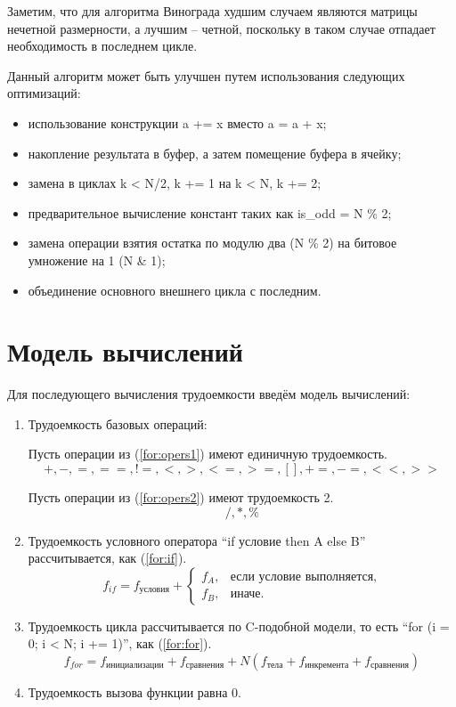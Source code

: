 \clearpage

Заметим, что для алгоритма Винограда худшим случаем являются матрицы нечетной размерности, а лучшим -- четной, поскольку
в таком случае отпадает необходимость в последнем цикле.

Данный алгоритм может быть улучшен путем использования следующих оптимизаций:
\begin{itemize}
	\item использование конструкции a += x вместо a = a + x;
	\item накопление результата в буфер, а затем помещение буфера в ячейку;
	\item замена в циклах k < N/2, k += 1 на k < N, k += 2;
	\item предварительное вычисление констант таких как is\_odd = N \% 2;
	\item замена операции взятия остатка по модулю два (N \% 2) на битовое умножение на 1 (N \& 1);
	\item объединение основного внешнего цикла с последним.
\end{itemize}



\clearpage
\section{Модель вычислений}

Для последующего вычисления трудоемкости введём модель вычислений:
\begin{enumerate}
	\item Трудоемкость базовых операций:
	
	Пусть операции из (\ref{for:opers1}) имеют единичную трудоемкость.
	\begin{equation}
	\label{for:opers1}
	+, -, =, ==, !=, <, >, <=, >=, [], +=, -=, <<, >>
	\end{equation}
	
	Пусть операции из (\ref{for:opers2}) имеют трудоемкость 2.
	\begin{equation}
	\label{for:opers2}
	/, *, \%
	\end{equation}
		
	\item Трудоемкость условного оператора ``if условие then A else B'' рассчитывается, как (\ref{for:if}).
	\begin{equation}
	\label{for:if}
	f_{if} = f_{\text{условия}} +
	\begin{cases}
	f_A, & \text{если условие выполняется,}\\
	f_B, & \text{иначе.}
	\end{cases}
	\end{equation}
	\item Трудоемкость цикла рассчитывается по C-подобной модели, то есть ``for (i = 0; i < N; i += 1)'', как (\ref{for:for}).
	\begin{equation}
	\label{for:for}
	f_{for} = f_{\text{инициализации}} + f_{\text{сравнения}} + N(f_{\text{тела}} + f_{\text{инкремента}} + f_{\text{сравнения}})
	\end{equation}
	\item Трудоемкость вызова функции равна 0.
\end{enumerate}



